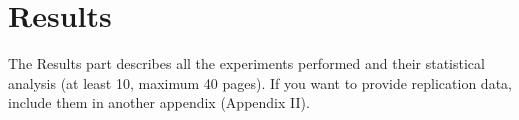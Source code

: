 \graphicspath{{chapters/05_results/}}
\chapter{Results}

The Results part describes all the experiments performed and their statistical analysis (at
least 10, maximum 40 pages). If you want to provide replication data, include them in another
appendix (Appendix II).